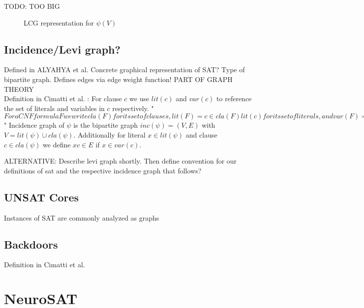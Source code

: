 TODO: TOO BIG
\begin{figure}[h]
    \centering
    \caption{LCG representation for $\psi(V)$}
    \label{fig:lcg-sat}
\end{figure}

\subsection{Incidence/Levi graph?}
Defined in ALYAHYA et al. Concrete graphical representation of SAT? Type of bipartite graph.
Defines edges via edge weight function! PART OF GRAPH THEORY \\
Definition in Cimatti et al. : For clause $c$ we use $lit(c)$ and $var(c)$ to reference the set of literals and variables in $c$ respectively. "$For a CNF formula F we write
cla(F) for its set of clauses, lit(F)= c \in cla(F) lit(c) for its set of literals, and
var(F)= c \in cla(F) var(c) for its set of variables.$"  Incidence graph of $\psi$ is the bipartite graph $inc(\psi) = (V,E)$ with $V=lit(\psi) \cup cla(\psi)$. Additionally for literal $x \in lit(\psi)$ and clause $c \in cla(\psi)$ we define $xc \in E$ if $x \in var(c)$.

ALTERNATIVE: Describe levi graph shortly. Then define convention for our definitions of sat and the respective incidence graph that follows?

\subsection{UNSAT Cores}
Instances of SAT are commonly analyzed as graphs

\subsection{Backdoors}
Definition in Cimatti et al.

\section{NeuroSAT}
